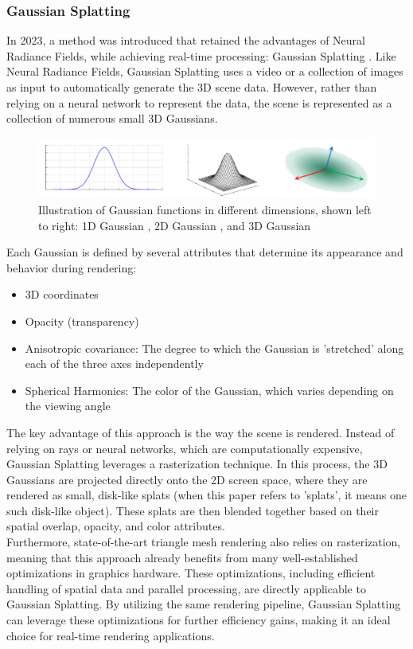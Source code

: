\documentclass[12pt]{article}
\begin{document}
\subsubsection{Gaussian Splatting}
In 2023, a method was introduced that retained the advantages of Neural Radiance Fields, while achieving real-time processing: Gaussian Splatting \parencite{OriginalSplatting}. Like Neural Radiance Fields, Gaussian Splatting uses a video or a collection of images as input to automatically generate the 3D scene data. However, rather than relying on a neural network to represent the data, the scene is represented as a collection of numerous small 3D Gaussians.
\begin{figure}[h!]
	\centering
	\includegraphics[width=\textwidth]{Images/GaussianForm.png}
	\caption{Illustration of Gaussian functions in different dimensions, shown left to right: 1D Gaussian \parencite{1DGaussian}, 2D Gaussian \parencite{2DGaussian}, and 3D Gaussian \parencite{3DGaussian}}
	\label{fig:Form}
\end{figure}
\newpage  \noindent
Each Gaussian is defined by several attributes that determine its appearance and behavior during rendering:
\begin{itemize}
	\item 3D coordinates
	\item Opacity (transparency)
	\item Anisotropic covariance: The degree to which the Gaussian is 'stretched' along each of the three axes independently
	\item Spherical Harmonics: The color of the Gaussian, which varies depending on the viewing angle
\end{itemize}
The key advantage of this approach is the way the scene is rendered. Instead of relying on rays or neural networks, which are computationally expensive, Gaussian Splatting leverages a rasterization technique. In this process, the 3D Gaussians are projected directly onto the 2D screen space, where they are rendered as small, disk-like splats (when this paper refers to 'splats', it means one such disk-like object). These splats are then blended together based on their spatial overlap, opacity, and color attributes.\\
Furthermore, state-of-the-art triangle mesh rendering also relies on rasterization, meaning that this approach already benefits from many well-established optimizations in graphics hardware. These optimizations, including efficient handling of spatial data and parallel processing, are directly applicable to Gaussian Splatting. By utilizing the same rendering pipeline, Gaussian Splatting can leverage these optimizations for further efficiency gains, making it an ideal choice for real-time rendering applications.
\end{document}

